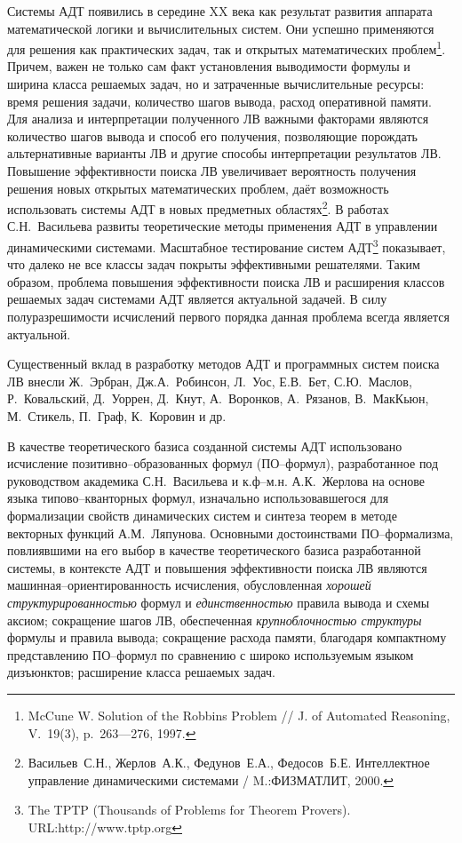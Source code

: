 \documentclass[a4paper]{report}
\begin{document}
Системы АДТ появились в середине XX века как результат развития аппарата математической логики и вычислительных систем. Они успешно применяются для решения как практических задач, так и открытых математических проблем\footnote{\small{McCune W. Solution of the Robbins Problem // J. of Automated Reasoning, V.~19(3), p.~263---276, 1997.}}. Причем, важен не только сам факт установления выводимости формулы и ширина класса решаемых задач, но и затраченные вычислительные ресурсы: время решения задачи, количество шагов вывода, расход оперативной памяти. Для анализа и интерпретации полученного ЛВ важными факторами являются количество шагов вывода и способ его получения, позволяющие порождать альтернативные варианты ЛВ и другие способы интерпретации результатов ЛВ. Повышение эффективности поиска ЛВ увеличивает вероятность получения решения новых открытых математических проблем, даёт возможность использовать системы АДТ в новых предметных областях\footnote{\small{Васильев~С.Н., Жерлов~А.К., Федунов~Е.А., Федосов~Б.Е.  Интеллектное управление динамическими системами /  M.:ФИЗМАТЛИТ, 2000.}}. В работах С.Н.~Васильева развиты теоретические методы применения АДТ в управлении динамическими системами. Масштабное тестирование систем АДТ\footnote{\small{The TPTP (Thousands of Problems for Theorem Provers). URL:http://www.tptp.org}} показывает, что далеко не все классы задач покрыты эффективными решателями. Таким образом, проблема повышения эффективности поиска ЛВ и расширения классов решаемых задач системами АДТ является актуальной задачей. В силу полуразрешимости исчислений первого порядка данная проблема всегда является актуальной.

Существенный вклад в разработку методов АДТ и программных систем поиска ЛВ внесли Ж.~Эрбран, Дж.А.~Робинсон, Л.~Уос, Е.В.~Бет, С.Ю.~Маслов, Р.~Ковальский, Д.~Уоррен, Д.~Кнут, А.~Воронков, А.~Рязанов, В.~МакКьюн, М.~Сти\-кель, П.~Граф, К.~Коровин и др. %

В качестве теоретического базиса созданной системы АДТ использовано исчисление позитивно--образованных формул (ПО--формул), разработанное под руководством академика С.Н.~Васильева и к.ф--м.н. А.К.~Жерлова на основе языка типово--кванторных формул, изначально использовавшегося для формализации свойств динамических систем и синтеза теорем в методе векторных функций А.М.~Ляпунова. Основными достоинствами ПО--формализма, повлиявшими на его выбор в качестве теоретического базиса разработанной системы, в контексте АДТ и повышения эффективности поиска ЛВ являются машинная--ориентированность исчисления, обусловленная \emph{хорошей структурированностью} формул и \emph{единственностью} правила вывода и схемы аксиом; сокращение шагов ЛВ, обеспеченная \emph{крупноблочностью структуры} формулы и правила вывода; сокращение расхода памяти, благодаря компактному представлению ПО--формул по сравнению с широко используемым языком дизъюнктов; расширение класса решаемых задач. %
\end{document}
